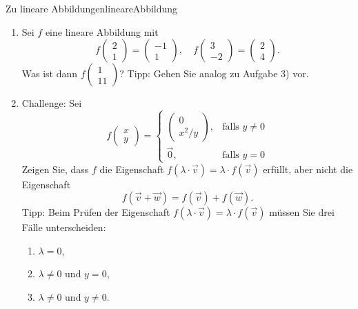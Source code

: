 \begin{ueb}{Zu lineare Abbildungen}{lineareAbbildung}
\begin{enumerate}
      
            \item Sei \( f \) eine lineare Abbildung mit  
            \[
            f \begin{pmatrix} 2 \\ 1 \end{pmatrix} = \begin{pmatrix} -1 \\ 1 \end{pmatrix}, 
            \quad f \begin{pmatrix} 3 \\ -2 \end{pmatrix} = \begin{pmatrix} 2 \\ 4 \end{pmatrix}.
            \]
            Was ist dann \( f \begin{pmatrix} 1 \\ 11 \end{pmatrix} \)?  
            Tipp: Gehen Sie analog zu Aufgabe 3) vor.
    
            \item Challenge: Sei  
            \[
            f \begin{pmatrix} x \\ y \end{pmatrix} =
            \begin{cases} 
                \begin{pmatrix} 0 \\ x^2 / y \end{pmatrix}, & \text{falls } y \neq 0 \\[8pt]
                \vec{0}, & \text{falls } y = 0
            \end{cases}
            \]
            Zeigen Sie, dass \( f \) die Eigenschaft \( f(\lambda \cdot \vec{v}) = \lambda \cdot f(\vec{v}) \) erfüllt, aber nicht die Eigenschaft  
            \[
            f(\vec{v} + \vec{w}) = f(\vec{v}) + f(\vec{w}).
            \]
            Tipp: Beim Prüfen der Eigenschaft \( f(\lambda \cdot \vec{v}) = \lambda \cdot f(\vec{v}) \) müssen Sie drei Fälle unterscheiden:
            \begin{enumerate}
                \item \( \lambda = 0 \),
                \item \( \lambda \neq 0 \) und \( y = 0 \),
                \item \( \lambda \neq 0 \) und \( y \neq 0 \).
            \end{enumerate}
        
    \end{enumerate}
    
\end{ueb}
